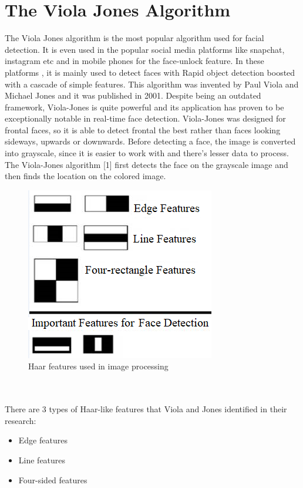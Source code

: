 \documentclass[12pt,a4paper]{article}
\begin{document}
\section{The Viola Jones Algorithm}
The Viola Jones algorithm is the most popular algorithm used for facial detection. It is even used in the popular social media platforms like snapchat, instagram etc and in mobile phones for the face-unlock feature. In these platforms , it is mainly used to detect faces with Rapid object detection boosted with a cascade of simple features. This algorithm was invented by  Paul Viola and Michael Jones and it was published in 2001. Despite being an outdated framework, Viola-Jones is quite powerful and its application has proven to be exceptionally notable in real-time face detection.
Viola-Jones was designed for frontal faces, so it is able to detect frontal the best rather than faces looking sideways, upwards or downwards. Before detecting a face, the image is converted into grayscale, since it is easier to work with and there's lesser data to process. The Viola-Jones algorithm [1] first detects the face on the grayscale image and then finds the location on the colored image.
\\
\begin{figure}[hb!]
\centerline{\includegraphics[scale=0.82]{haar_features.png}}
\caption{Haar features used in image processing}
\end{figure}
\\ \\
There are 3 types of Haar-like features that Viola and Jones identified in their research:
\begin{itemize}
\item Edge features
\item Line features
\item Four-sided features
\end{itemize}
\end{document}
